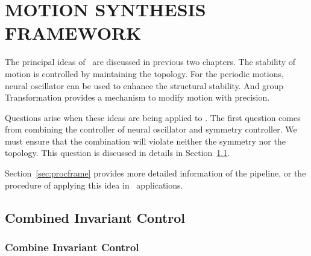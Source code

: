 \chapter {MOTION SYNTHESIS FRAMEWORK}
\label{chap:msf}
\graphicspath{{CombineFramework/CombineFrameworkFigs/EPS/}{CombineFramework/CombineFrameworkFigs/}}
The principal ideas of \moit\ are discussed in previous two chapters.
The stability of motion is controlled by maintaining the topology.
For the periodic motions, neural oscillator can be used to enhance the structural stability.
And group Transformation provides a mechanism to modify motion with precision.


Questions arise when these ideas are being applied  to \cms.
The first question comes from combining the controller of neural oscillator and symmetry controller.
We must ensure that the combination will violate neither the symmetry nor the topology.
This question is discussed in details in Section~\ref{sec:combin}.


Section~\ref{sec:procframe} provides more detailed information of the pipeline, or the procedure of applying this idea in \cms\  applications.

%
%
%
%

\section{Combined Invariant Control}
\label{sec:combin}
\subsection{ Combine Invariant Control}

